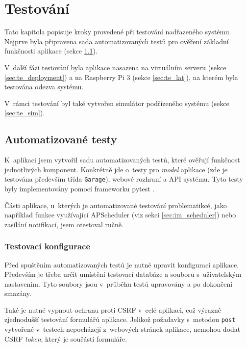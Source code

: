 \chapter{Testování}
\label{sec:te}

Tato kapitola popisuje kroky provedené při testování nadřazeného systému. Nejprve byla připravena sada automatizovaných testů pro ověření základní funkčnosti aplikace (sekce \ref{sec:te_auto}). 

V~další fázi testování byla aplikace nasazena na virtuálním serveru (sekce \ref{sec:te_deployment}) a na Raspberry Pi 3 (sekce \ref{sec:te_lat}), na kterém byla testována odezva systému.

V~rámci testování byl také vytvořen simulátor podřízeného systému (sekce \ref{sec:te_sim}).

\section{Automatizované testy}
\label{sec:te_auto}

K~aplikaci jsem vytvořil sadu automatizovaných testů, které ověřují funkčnost jednotlivých komponent. Konkrétně jde o~testy pro \textit{model} aplikace (zde je testována především třída \texttt{Garage}), webové rozhraní a API systému. Tyto testy byly implementovány pomocí frameworku pytest \cite{pytest}.

Části aplikace, u~kterých je automatizované testování problematikcé, jako například funkce využívající APScheduler (viz sekci \ref{sec:im_scheduler}) nebo zasílání notifikací, jsem otestoval ručně.

\subsection{Testovací konfigurace}

Před spuštěním automatizovaných testů je nutné upravit konfiguraci aplikace. Především je třeba určit umístění testovací databáze a souboru s~uživatelským nastavením. Tyto soubory jsou v~průběhu testů upravovány a po dokončení smazány.

Také je nutné vypnout ochranu proti CSRF v~celé aplikaci, což výrazně zjednodušší testování formulářů aplikace. Jelikož požadavky s~metodou \texttt{post} vytvořené v~testech nepocházejí z~webových stránek aplikace, nemohou dodat CSRF \textit{token}, který je součástí formuláře. 

